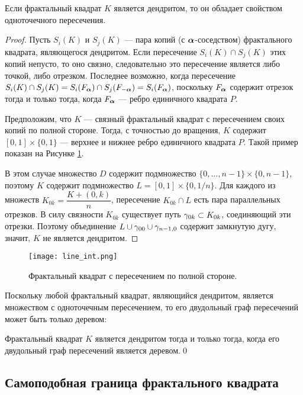 \begin{proposition}
\label{thm:den_necessary_sufficient}
Если фрактальный квадрат $K$ является дендритом, то он обладает свойством одноточечного пересечения.
\end{proposition}

\begin{proof}
Пусть $S_i(K)$ и $S_j(K)$ --- пара копий (с ${\bm{\alpha}}$-соседством) фрактального квадрата, являющегося дендритом.
Если пересечение $S_i(K)\cap S_j(K)$ этих копий непусто, то оно связно, следовательно это пересечение  является либо точкой, либо отрезком.
Последнее возможно, когда пересечение $S_i(K)\cap S_j(K)=S_i(F_{\bm{\alpha}})\cap S_j(F_{-{\bm{\alpha}}})=S_i(F_{\bm{\alpha}})$, поскольку $F_{\bm{\alpha}}$ содержит отрезок тогда и только тогда, когда $F_{\bm{\alpha}}$ --- ребро единичного квадрата $P$. 

Предположим, что $K$ --- связный фрактальный квадрат с пересечением своих копий по полной стороне. 
Тогда, с точностью до вращения, $K$ содержит $[0,1]\times\{0,1\}$  --- верхнее и нижнее ребро единичного квадрата $P$.
Такой пример показан на Рисунке \ref{fig:line_int}.

В этом случае множество $D$ содержит подмножество $ \{0,\ldots,n-1\}\times \{0,n-1\}$, поэтому $K$ содержит подмножество $L=[0,1]\times\{0,1/n\}$. 
Для каждого из множеств $K_{0k}=\dfrac{K+(0,k)}{n}$, пересечение $K_{0k}\cap L$ есть пара параллельных отрезков. 
В силу связности $K_{0k}$ существует путь $\gamma_{0k}\subset K_{0k}$, соединяющий эти  отрезки. 
Поэтому объединение $L\cup\gamma_{00}\cup\gamma_{n-1,0}$ содержит замкнутую дугу, значит, $K$ не является дендритом. 
\end{proof}

\begin{figure}[H]
 \centering
 \texttt{[image: line\_int.png]}
 \caption{Фрактальный квадрат с пересечением по полной стороне.}
 \label{fig:line_int}
\end{figure}

Поскольку любой фрактальный квадрат, являющийся дендритом, является множеством с одноточечным пересечением, то его двудольный граф пересечений может быть только деревом:

\begin{corollary}\label{cor:fsden}
Фрактальный квадрат $K$ является дендритом тогда и только тогда, когда его двудольный граф пересечений является деревом.\hfill\qed
\end{corollary}


\subsection{Самоподобная граница фрактального квадрата}

